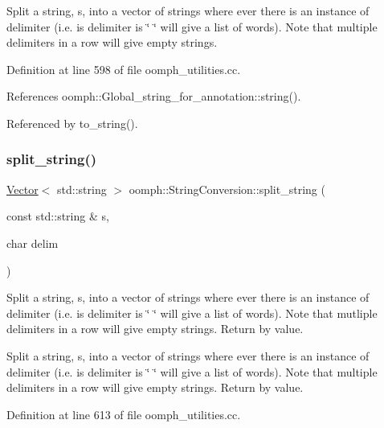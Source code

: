 Split a string, s, into a vector of strings where ever there is an instance of delimiter (i.\+e. is delimiter is \char`\"{} \char`\"{} will give a list of words). Note that multiple delimiters in a row will give empty strings. 

Definition at line 598 of file oomph\+\_\+utilities.\+cc.



References oomph\+::\+Global\+\_\+string\+\_\+for\+\_\+annotation\+::string().



Referenced by to\+\_\+string().

\mbox{\label{namespaceoomph_1_1StringConversion_a15f87a508bc9515945d8c8891e7134a9}} 
\subsubsection{\texorpdfstring{split\+\_\+string()}{split\_string()}\hspace{0.1cm}{\footnotesize\ttfamily [2/2]}}
{\footnotesize\ttfamily \hyperlink{classoomph_1_1Vector}{Vector}$<$ std\+::string $>$ oomph\+::\+String\+Conversion\+::split\+\_\+string (\begin{DoxyParamCaption}\item[{const std\+::string \&}]{s,  }\item[{char}]{delim }\end{DoxyParamCaption})}



Split a string, s, into a vector of strings where ever there is an instance of delimiter (i.\+e. is delimiter is \char`\"{} \char`\"{} will give a list of words). Note that mutliple delimiters in a row will give empty strings. Return by value. 

Split a string, s, into a vector of strings where ever there is an instance of delimiter (i.\+e. is delimiter is \char`\"{} \char`\"{} will give a list of words). Note that multiple delimiters in a row will give empty strings. Return by value. 

Definition at line 613 of file oomph\+\_\+utilities.\+cc.

\mbox{\label{namespaceoomph_1_1StringConversion_aab6637703088959640bd73844a597728}} 

